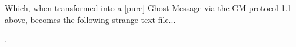\documentclass[a4paper, 18pt]{book} %
\begin{document}
{{{\vspace{1em}

Which, when transformed into a [pure] Ghost Message via the GM protocol 1.1 above, becomes the following strange text file...


\vspace{2em}


     \begin{tcbverbatim}[title=Sample OUTPUT GHOST Text Message --- a TEA program --- encoded using GM v1.1]
.                                          
                                           
                                           
                                           
                                           
                                           
                                           
                                           
                                           
                                           
                                           
                                           
                                           
                                           
                                           
                                           
                                           
                                           
                                           
                                          
                                              
                                                              
     
            
            
               
                           
                                                                             
               
                  
            
    
                                               
                                              
                                                                                 
                           

\end{tcbverbatim}}}}
\end{document}
